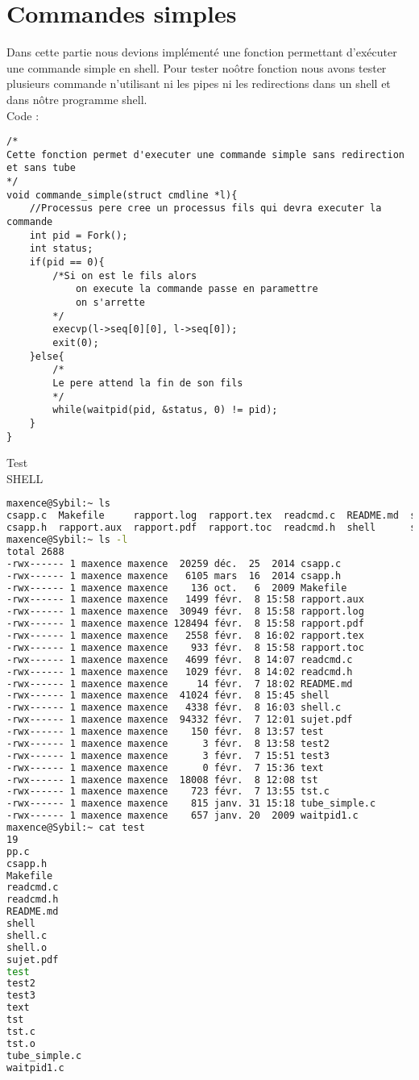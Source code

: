 \documentclass{report}
\begin{document}
		\section{Commandes simples}
		Dans cette partie nous devions impl\'ement\'e une fonction permettant d'ex\'ecuter une commande simple en shell. Pour tester no\^otre fonction nous avons tester plusieurs commande n'utilisant ni les pipes ni les redirections dans un shell et dans n\^otre programme shell. \\
		Code :
		\begin{lstlisting}
/*
Cette fonction permet d'executer une commande simple sans redirection et sans tube
*/
void commande_simple(struct cmdline *l){
	//Processus pere cree un processus fils qui devra executer la commande
	int pid = Fork();
	int status;
	if(pid == 0){
		/*Si on est le fils alors
			on execute la commande passe en paramettre
			on s'arrette
		*/
		execvp(l->seq[0][0], l->seq[0]);
		exit(0);
	}else{
		/*
		Le pere attend la fin de son fils
		*/
		while(waitpid(pid, &status, 0) != pid);
	}
}
		\end{lstlisting} 
		Test \\ SHELL
		\begin{lstlisting}[frame=single,basicstyle=\footnotesize,language=bash]
maxence@Sybil:~ ls
csapp.c  Makefile     rapport.log  rapport.tex  readcmd.c  README.md  shell.c    test   test3  tst    tube_simple.c
csapp.h  rapport.aux  rapport.pdf  rapport.toc  readcmd.h  shell      sujet.pdf  test2  text   tst.c  waitpid1.c
maxence@Sybil:~ ls -l
total 2688
-rwx------ 1 maxence maxence  20259 déc.  25  2014 csapp.c
-rwx------ 1 maxence maxence   6105 mars  16  2014 csapp.h
-rwx------ 1 maxence maxence    136 oct.   6  2009 Makefile
-rwx------ 1 maxence maxence   1499 févr.  8 15:58 rapport.aux
-rwx------ 1 maxence maxence  30949 févr.  8 15:58 rapport.log
-rwx------ 1 maxence maxence 128494 févr.  8 15:58 rapport.pdf
-rwx------ 1 maxence maxence   2558 févr.  8 16:02 rapport.tex
-rwx------ 1 maxence maxence    933 févr.  8 15:58 rapport.toc
-rwx------ 1 maxence maxence   4699 févr.  8 14:07 readcmd.c
-rwx------ 1 maxence maxence   1029 févr.  8 14:02 readcmd.h
-rwx------ 1 maxence maxence     14 févr.  7 18:02 README.md
-rwx------ 1 maxence maxence  41024 févr.  8 15:45 shell
-rwx------ 1 maxence maxence   4338 févr.  8 16:03 shell.c
-rwx------ 1 maxence maxence  94332 févr.  7 12:01 sujet.pdf
-rwx------ 1 maxence maxence    150 févr.  8 13:57 test
-rwx------ 1 maxence maxence      3 févr.  8 13:58 test2
-rwx------ 1 maxence maxence      3 févr.  7 15:51 test3
-rwx------ 1 maxence maxence      0 févr.  7 15:36 text
-rwx------ 1 maxence maxence  18008 févr.  8 12:08 tst
-rwx------ 1 maxence maxence    723 févr.  7 13:55 tst.c
-rwx------ 1 maxence maxence    815 janv. 31 15:18 tube_simple.c
-rwx------ 1 maxence maxence    657 janv. 20  2009 waitpid1.c
maxence@Sybil:~ cat test
19
pp.c
csapp.h
Makefile
readcmd.c
readcmd.h
README.md
shell
shell.c
shell.o
sujet.pdf
test
test2
test3
text
tst
tst.c
tst.o
tube_simple.c
waitpid1.c
		\end{lstlisting}
\end{document}
